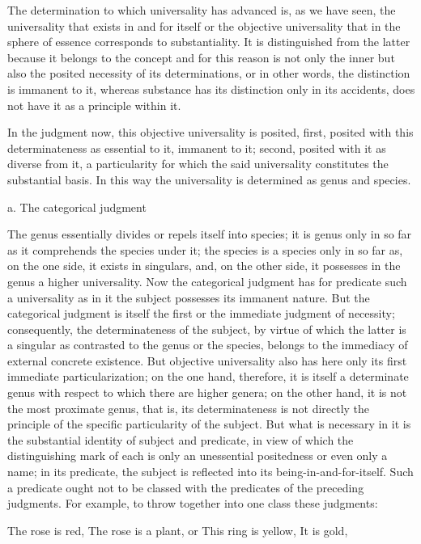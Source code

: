 The determination to which universality has advanced is,
as we have seen, the universality
that exists in and for itself
or the objective universality that
in the sphere of essence corresponds to substantiality.
It is distinguished from the latter
because it belongs to the concept
and for this reason is not only the inner
but also the posited necessity of its determinations,
or in other words, the distinction is immanent to it,
whereas substance has its distinction only in its accidents,
does not have it as a principle within it.

In the judgment now, this objective universality is posited,
first, posited with this determinateness
as essential to it, immanent to it;
second, posited with it as diverse from it,
a particularity for which the said universality
constitutes the substantial basis.
In this way the universality is determined
as genus and species.

a. The categorical judgment

The genus essentially divides
or repels itself into species;
it is genus only in so far as
it comprehends the species under it;
the species is a species only in so far as,
on the one side, it exists in singulars,
and, on the other side, it possesses
in the genus a higher universality.
Now the categorical judgment has
for predicate such a universality
as in it the subject possesses its immanent nature.
But the categorical judgment is itself
the first or the immediate judgment of necessity;
consequently, the determinateness of the subject,
by virtue of which the latter is a singular
as contrasted to the genus or the species,
belongs to the immediacy of external concrete existence.
But objective universality also has here
only its first immediate particularization;
on the one hand, therefore,
it is itself a determinate genus
with respect to which there are higher genera;
on the other hand, it is not the most proximate genus,
that is, its determinateness is not directly the
principle of the specific particularity of the subject.
But what is necessary in it is
the substantial identity of subject and predicate,
in view of which the distinguishing mark of each is
only an unessential positedness or even only a name;
in its predicate, the subject is
reflected into its being-in-and-for-itself.
Such a predicate ought not to be classed
with the predicates of the preceding judgments.
For example, to throw together into one class
these judgments:

The rose is red,
The rose is a plant,
or This ring is yellow,
It is gold,

